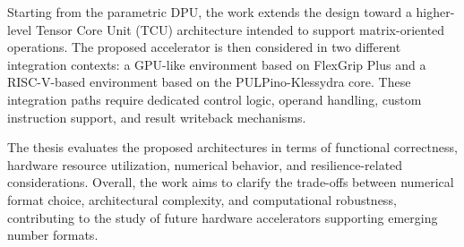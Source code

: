 \documentclass[a4paper,11pt,twoside,english]{toptesi}
\begin{document}
Starting from the parametric DPU, the work extends the design toward a higher-level Tensor Core Unit (TCU) architecture intended to support matrix-oriented operations. The proposed accelerator is then considered in two different integration contexts: a GPU-like environment based on FlexGrip Plus and a RISC-V-based environment based on the PULPino-Klessydra core. These integration paths require dedicated control logic, operand handling, custom instruction support, and result writeback mechanisms.

The thesis evaluates the proposed architectures in terms of functional correctness, hardware resource utilization, numerical behavior, and resilience-related considerations. Overall, the work aims to clarify the trade-offs between numerical format choice, architectural complexity, and computational robustness, contributing to the study of future hardware accelerators supporting emerging number formats.

\indici

\mainmatter




















\end{document}
